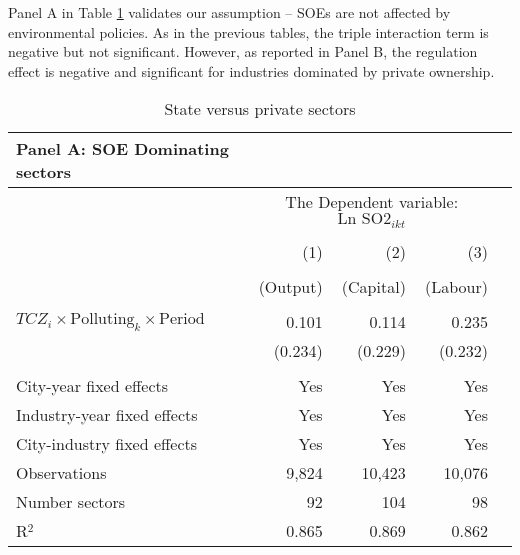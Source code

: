 \documentclass[12pt]{article}
\begin{document}
Panel A in Table \ref{tab:table7} validates our assumption – SOEs are not affected by environmental policies. As in the previous tables, the triple interaction term is negative but not significant. However, as reported in Panel B, the regulation effect is negative and significant for industries dominated by private ownership.


\begin{table}[!htb] \centering
    \caption{State versus private sectors}
      \begin{adjustbox}{width=\textwidth, totalheight=\baselineskip,keepaspectratio}
     \label{tab:table7}
      \begin{tabular}{lrrrr}
        \multicolumn{1}{l}{\textbf{Panel A: SOE Dominating sectors}} \\
        \toprule
        & \multicolumn{3}{c}{The Dependent variable: $\text{Ln SO2}_{ikt}$} \\
        \cline{2-4}
        \\[-1.8ex] & (1) & (2) & (3) \\
        \\[-1.8ex] & (Output) & (Capital) & (Labour)\\
        \hline \\[-1.8ex]
        $TCZ_i \times \text{Polluting}_k \times \text{Period}$ & 0.101           & 0.114           & 0.235           \\
                                                            & (0.234)         & (0.229)         & (0.232)         \\
        \hline \\[-1.8ex]
        City-year fixed effects                             & Yes             & Yes             & Yes             \\
        Industry-year fixed effects                         & Yes             & Yes             & Yes             \\
        City-industry fixed effects                         & Yes             & Yes             & Yes             \\
        Observations                                        & 9,824           & 10,423          & 10,076          \\
        Number sectors                                      & 92              & 104             & 98              \\
        R$^{2}$                                             & 0.865           & 0.869           & 0.862           \\

\end{tabular}
\end{adjustbox}
\end{table}
\end{document}
